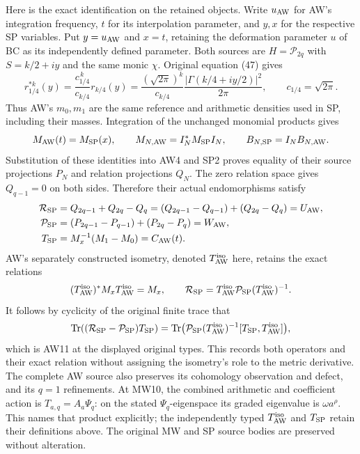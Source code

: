 \documentclass[11pt,a4paper]{article}
\begin{document}
Here is the exact identification on the retained objects. Write
$u_{\rm AW}$ for AW's integration frequency, $t$ for its interpolation
parameter, and $y,x$ for the respective SP variables. Put
$y=u_{\rm AW}$ and $x=t$, retaining the deformation parameter $u$ of BC
as its independently defined parameter. Both sources are
$H=\mathcal P_{2q}$ with $S=k/2+iy$ and the same monic $\chi$.
Original equation (47) gives
\[
 r_{1/4}^{*k}(y)
  =\frac{c_{1/4}^{\,k}}{c_{k/4}}r_{k/4}(y)
  =\frac{(\sqrt{2\pi})^k}{c_{k/4}}
     \frac{|\Gamma(k/4+iy/2)|^2}{2\pi},
 \qquad c_{1/4}=\sqrt{2\pi}.
\]
Thus AW's $m_0,m_1$ are the same reference and arithmetic densities
used in SP, including their masses. Integration of the unchanged
monomial products gives
\[
 M_{\rm AW}(t)=M_{\rm SP}(x),\qquad
 M_{N,\rm AW}=I_N^*M_{\rm SP}I_N,\qquad
 B_{N,\rm SP}=I_N B_{N,\rm AW}.
\]
Substitution of these identities into AW4 and SP2 proves equality
of their source projections $P_N$ and relation projections $Q_N$.
The zero relation space gives $Q_{q-1}=0$ on both sides. Therefore
their actual endomorphisms satisfy
\[
 \begin{aligned}
 \mathcal R_{\rm SP}
 &=Q_{2q-1}+Q_{2q}-Q_q
   =(Q_{2q-1}-Q_{q-1})+(Q_{2q}-Q_q)=U_{\rm AW},\\
 \mathcal P_{\rm SP}
 &=(P_{2q-1}-P_{q-1})+(P_{2q}-P_q)=W_{\rm AW},\\
 T_{\rm SP}&=M_x^{-1}(M_1-M_0)=C_{\rm AW}(t).
 \end{aligned}
\]
AW's separately constructed isometry, denoted $T_{\rm AW}^{\rm iso}$
here, retains the exact relations
\[
 (T_{\rm AW}^{\rm iso})^*M_xT_{\rm AW}^{\rm iso}=M_x,
 \qquad
 \mathcal R_{\rm SP}
   =T_{\rm AW}^{\rm iso}\mathcal P_{\rm SP}
                (T_{\rm AW}^{\rm iso})^{-1}.
\]
It follows by cyclicity of the original finite trace that
\[
 \operatorname{Tr}((\mathcal R_{\rm SP}-\mathcal P_{\rm SP})T_{\rm SP})
  =\operatorname{Tr}\bigl(\mathcal P_{\rm SP}
       (T_{\rm AW}^{\rm iso})^{-1}[T_{\rm SP},T_{\rm AW}^{\rm iso}]\bigr),
\]
which is AW11 at the displayed original types. This records both
operators and their exact relation without assigning the isometry's
role to the metric derivative. The complete AW source also preserves
its cohomology observation and defect, and its $q=1$ refinements.
At MW10, the combined arithmetic and coefficient action is
$T_{a,q}=A_a\Psi_q$: on the stated $\Psi_q$-eigenspace its graded
eigenvalue is $\omega a^\rho$. This names that product explicitly;
the independently typed $T_{\rm AW}^{\rm iso}$ and $T_{\rm SP}$ retain
their definitions above. The original MW and SP source bodies are
preserved without alteration.
\end{document}
